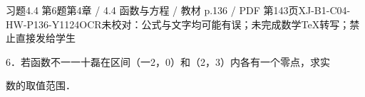 \begin{bankitem}{习题4.4 第6题}{第4章 / 4.4 函数与方程 / 教材 p.136 / PDF 第143页}{XJ-B1-C04-HW-P136-Y1124}{OCR未校对：公式与文字均可能有误；未完成数学TeX转写；禁止直接发给学生}
\begin{ocrdraft}
\par
6．若函数不一一十磊在区间（一2，0）和（2，3）内各有一个零点，求实
\par
数的取值范围．
\end{ocrdraft}
\end{bankitem}
